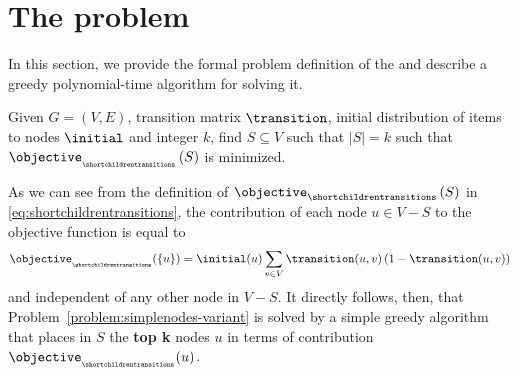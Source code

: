 \section{The \variant{\childrentransitions} problem}
\label{sec:simplenodes}

In this section, we provide the formal problem definition of the 
{\variant{\childrentransitions}}
and describe a greedy polynomial-time algorithm for solving it.

\begin{problem}[{\variant{\nodeitems}}]
\label{problem:simplenodes-variant}
Given $G=(V,E)$, transition matrix $\transition$, 
initial distribution of items to nodes
$\initial$ and integer $k$, find
$S\subseteq V$ such that $|S|=k$ such that 
$\objective_{_\shortchildrentransitions}\left(S\right)$ is minimized.
\label{problem:simple-nodes-variant}
\end{problem}

As we can see from the definition of 
$\objective_\shortchildrentransitions\left(S\right)$ 
in \eqref{eq:shortchildrentransitions},
the contribution of each node $u\in {V-S}$
to the objective function is equal to
\begin{equation}
\label{eq:parent-contribution}
\objective_{_\shortchildrentransitions}(\{u\}) = 
	\initial(u)\sum_{v\in V}\transition(u,v)\left(1-\transition(u,v)\right)
\end{equation}
and independent of any other node in $V-S$.
It directly follows, then, that Problem~\ref{problem:simplenodes-variant}
is solved by a simple greedy algorithm
that places in $S$ the {\bf top k} nodes $u$ in terms
of contribution $\objective_{_\shortchildrentransitions}(u)$.
